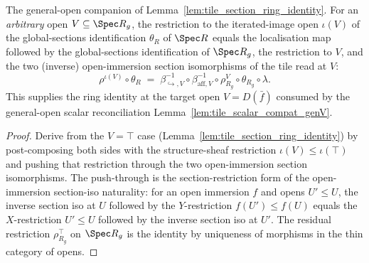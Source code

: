 \begin{lemma}
  \label{lem:tile_section_ring_identity_genV}
  The general-open companion of Lemma~\ref{lem:tile_section_ring_identity}. For an \emph{arbitrary}
  open \(V \subseteq \Spec R_g\), the restriction to the iterated-image open \(\iota(V)\) of the
  global-sections identification \(\theta_R\) of \(\Spec R\) equals the localisation map followed by the
  global-sections identification of \(\Spec R_g\), the restriction to \(V\), and the two (inverse)
  open-immersion section isomorphisms of the tile read at \(V\):
  \[
    \rho^{\iota(V)} \circ \theta_R
    \;=\;
    \beta_{\hookrightarrow,V}^{-1} \circ \beta_{\mathrm{aff},V}^{-1} \circ \rho^{V}_{R_g} \circ \theta_{R_g} \circ \lambda.
  \]
  This supplies the ring identity at the target open \(V = D(\bar f)\) consumed by the general-open
  scalar reconciliation Lemma~\ref{lem:tile_scalar_compat_genV}.
\end{lemma}
\begin{proof}
  Derive from the \(V = \top\) case (Lemma~\ref{lem:tile_section_ring_identity}) by post-composing both
  sides with the structure-sheaf restriction \(\iota(V) \le \iota(\top)\) and pushing that restriction
  through the two open-immersion section isomorphisms. The push-through is the section-restriction form
  of the open-immersion section-iso naturality: for an open immersion \(f\) and opens \(U' \le U\), the
  inverse section iso at \(U\) followed by the \(Y\)-restriction \(f(U') \le f(U)\) equals the
  \(X\)-restriction \(U' \le U\) followed by the inverse section iso at \(U'\). The residual restriction
  \(\rho^{\top}_{R_g}\) on \(\Spec R_g\) is the identity by
  uniqueness of morphisms in the thin category of opens.
\end{proof}

